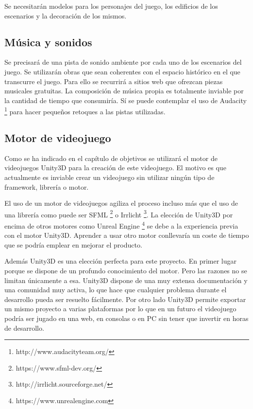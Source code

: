 Se necesitarán modelos para los personajes del juego, los edificios de los escenarios y la decoración de los mismos.

\subsection{Música y sonidos}

Se precisará de una pista de sonido ambiente por cada uno de los escenarios del juego. Se utilizarán obras que sean coherentes con el espacio histórico en el que transcurre el juego. Para ello se recurrirá a sitios web que ofrezcan piezas musicales gratuitas. La composición de música propia es totalmente inviable por la cantidad de tiempo que consumiría. Sí se puede contemplar el uso de Audacity \footnote{http://www.audacityteam.org/} para hacer pequeños retoques a las pistas utilizadas.

\subsection{Motor de videojuego}

Como se ha indicado en el capítulo de objetivos se utilizará el motor de videojuegos Unity3D para la creación de este videojuego. El motivo es que actualmente es inviable crear un videojuego sin utilizar ningún tipo de framework, librería o motor. 

El uso de un motor de videojuegos agiliza el proceso incluso más que el uso de una librería como puede ser SFML \footnote{https://www.sfml-dev.org/} o Irrlicht \footnote{http://irrlicht.sourceforge.net/}. La elección de Unity3D por encima de otros motores como Unreal Engine \footnote{https://www.unrealengine.com} se debe a la experiencia previa con el motor Unity3D. Aprender a usar otro motor conllevaría un coste de tiempo que se podría emplear en mejorar el producto. 

Además Unity3D es una elección perfecta para este proyecto. En primer lugar porque se dispone de un profundo conocimiento del motor. Pero las razones no se limitan únicamente a esa. Unity3D dispone de una muy extensa documentación y una comunidad muy activa, lo que hace que cualquier problema durante el desarrollo pueda ser resuelto fácilmente. Por otro lado Unity3D permite exportar un mismo proyecto a varias plataformas por lo que en un futuro el videojuego podría ser jugado en una web, en consolas o en PC sin tener que invertir en horas de desarrollo.